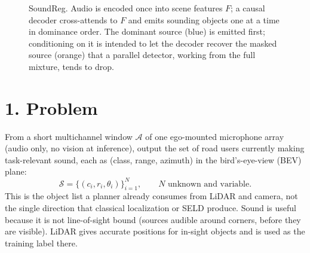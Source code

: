 \documentclass[10pt]{article}
\newcommand{\A}{\mathcal{A}}
\newcommand{\Sset}{\mathcal{S}}
\newcommand{\eos}{\texttt{[EOS]}}
\begin{document}
\begin{figure}[t]
\caption{SoundReg. Audio is encoded once into scene features $F$; a causal decoder
cross-attends to $F$ and emits sounding objects one at a time in dominance order.
The dominant source (blue) is emitted first; conditioning on it is intended to let the
decoder recover the masked source (orange) that a parallel detector, working from
the full mixture, tends to drop.}
\label{fig:arch}
\end{figure}


\section*{1. Problem}
From a short multichannel window $\A$ of one ego-mounted microphone array (audio
only, no vision at inference), output the set of road users currently making
task-relevant sound, each as (class, range, azimuth) in the bird's-eye-view (BEV)
plane:
\[
\mathcal{S}=\{(c_i,r_i,\theta_i)\}_{i=1}^{N},\qquad N \text{ unknown and variable.}
\]
This is the object list a planner already consumes from LiDAR and camera, not the
single direction that classical localization or SELD produce. Sound is useful
because it is not line-of-sight bound (sources audible around corners, before they
are visible). LiDAR gives accurate positions for in-sight objects and is used as
the training label there.
\end{document}
